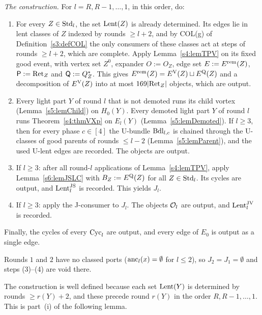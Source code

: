 \begin{construction}
\emph{The construction.} For $l=R,R-1,\dots,1$, in this order, do:
\begin{enumerate}
\item[(1)] For every $Z\in\mathrm{Std}_l$, the set $\mathrm{Lent}(Z)$ is already determined. Its edges lie in lent classes of $Z$ indexed by rounds $\ge l+2$, and by COL(g) of Definition~\ref{s3:defCOL} the only consumers of these classes act at steps of rounds $\ge l+2$, which are complete. Apply Lemma~\ref{s4:lemTPV} on its fixed good event, with vertex set $Z^0$, expander $O:=O_Z$, edge set $E:=E^{\mathrm{rem}}(Z)$, $\mathsf{P}:=\mathrm{Ret}_Z$ and $\mathsf{Q}:=Q^{*}_Z$. This gives $E^{\mathrm{rem}}(Z)=E^{\mathrm{V}}(Z)\sqcup E^{\mathrm{Q}}(Z)$ and a decomposition of $E^{\mathrm{V}}(Z)$ into at most $169|\mathrm{Ret}_Z|$ objects, which are output.
\item[(2)] Every light part $Y$ of round $l$ that is not demoted runs its child vortex (Lemma~\ref{s5:lemChild}) on $H_0(Y)$. Every demoted light part $Y$ of round $l$ runs Theorem~\ref{s4:thmVXp} on $E_l(Y)$ (Lemma~\ref{s5:lemDemoted}). If $l\ge3$, then for every phase $c\in[4]$ the U-bundle $\mathrm{Bdl}_{l,c}$ is chained through the U-classes of good parents of rounds $\le l-2$ (Lemma~\ref{s5:lemParent}), and the used U-lent edges are recorded. The objects are output.
\item[(3)] If $l\ge3$: after all round-$l$ applications of Lemma~\ref{s4:lemTPV}, apply Lemma~\ref{s6:lemJSLC} with $B_Z:=E^{\mathrm{Q}}(Z)$ for all $Z\in\mathrm{Std}_l$. Its cycles are output, and $\mathrm{Lent}^{\mathrm{JS}}_l$ is recorded. This yields $J_l$.
\item[(4)] If $l\ge3$: apply the J-consumer to $J_l$. The objects $\mathcal{O}_l$ are output, and $\mathrm{Lent}^{\mathrm{JV}}_l$ is recorded.
\end{enumerate}
Finally, the cycles of every $\mathrm{Cyc}_l$ are output, and every edge of $E_0$ is output as a single edge.

Rounds $1$ and $2$ have no classed ports ($\mathrm{anc}_l(x)=\emptyset$ for $l\le2$), so $J_2=J_1=\emptyset$ and steps (3)--(4) are void there.
\deps{\ref{s4:lemTPV}, \ref{s5:lemChild}, \ref{s5:lemParent}, \ref{s5:lemDemoted}, \ref{s6:lemJSLC}, \ref{s6:defJconsumer}, \ref{s6:defLending}, \ref{s5:defStages}, \ref{s4:thmVXp}, \ref{s3:defCOL}}
\end{construction}

The construction is well defined because each set $\mathrm{Lent}(Y)$ is determined by rounds $\ge r(Y)+2$, and these precede round $r(Y)$ in the order $R,R-1,\dots,1$. This is part~(i) of the following lemma.

